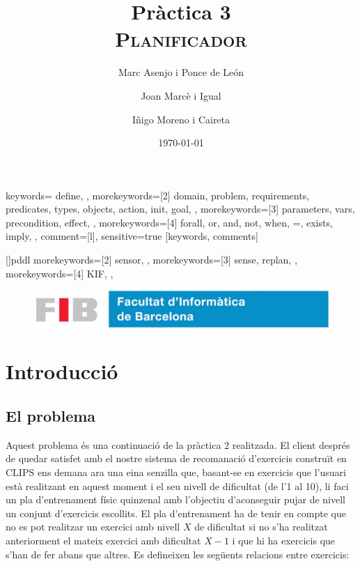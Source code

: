 \documentclass[a4paper,12pt, UTF-8]{article}
\title{
	\Huge
	\textbf{Pràctica 3} \\ 
	\scshape Planificador
}
\author{
	Marc Asenjo i Ponce de León \and
	Joan Marcè i Igual \and
	Iñigo Moreno i Caireta
}
\date{\today}
\begin{document}
	
{
	keywords={
		define,
	},
	morekeywords={[2]
		domain,
		problem,
		requirements,
		predicates,
		types,
		objects,
		action,
		init,
		goal,
	},
	morekeywords={[3]
		parameters,
		vars,
		precondition,
		effect,
	},
	morekeywords={[4]
		forall,
		or,
		and,
		not,
		when,
		=,
		exists,
		imply,
	},
	comment=[l]{\;},
	sensitive=true
}[keywords, comments]

[]{pddl}
{
	morekeywords={[2]
		sensor,
	},
	morekeywords={[3]
		sense,
		replan,
	},
	morekeywords={[4]
		KIF,
	},
}

\lstset{language=pddl}



\maketitle

\begin{figure}
	\centering
	\includegraphics[width=0.8\linewidth]{./simple_FIB}
\end{figure}

\newpage

\tableofcontents

\newpage

\section{Introducció}

\subsection{El problema}

Aquest problema és una continuació de la pràctica 2 realitzada. El client després de quedar satisfet amb el nostre sistema de recomanació d'exercicis construït en CLIPS ens demana ara una eina senzilla que, basant-se en exercicis que l'usuari està realitzant en aquest moment i el seu nivell de dificultat (de l'1 al 10), li faci un pla d'entrenament físic quinzenal amb l'objectiu d'aconseguir pujar de nivell un conjunt d'exercicis escollits. El pla d'entrenament ha de tenir en compte que no es pot realitzar un exercici amb nivell $X$ de dificultat si no s'ha realitzat anteriorment el mateix exercici amb dificultat $X - 1$ i que hi ha exercicis que s'han de fer abans que altres. Es defineixen les següents relacions entre exercicis:
\end{document}
